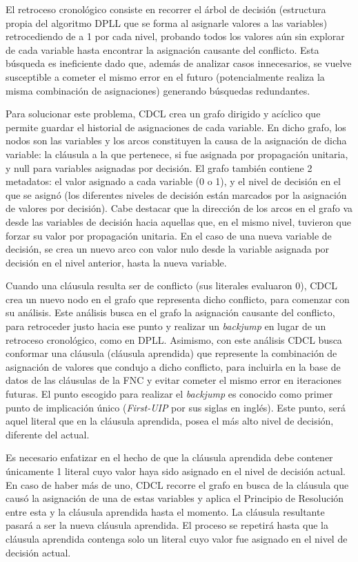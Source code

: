 El retroceso cronológico consiste en recorrer el árbol de decisión (estructura propia del algoritmo DPLL que se forma al asignarle valores a las variables) retrocediendo de a 1 por cada nivel, probando todos los valores aún sin explorar de cada variable hasta encontrar la asignación causante del conflicto. Esta búsqueda es ineficiente dado que, además de analizar casos innecesarios, se vuelve susceptible a cometer el mismo error en el futuro (potencialmente realiza la misma combinación de asignaciones) generando búsquedas redundantes.

Para solucionar este problema, CDCL crea un grafo dirigido y acíclico que permite guardar el historial de asignaciones de cada variable. En dicho grafo, los nodos son las variables y los arcos constituyen la causa de la asignación de dicha variable: la cláusula a la que pertenece, si fue asignada por propagación unitaria, y null para variables asignadas por decisión. El grafo también contiene 2 metadatos: el valor asignado a cada variable (0 o 1), y el nivel de decisión en el que se asignó (los diferentes niveles de decisión están marcados por la asignación de valores por decisión). Cabe destacar que la dirección de los arcos en el grafo va desde las variables de decisión hacia aquellas que, en el mismo nivel, tuvieron que forzar su valor por propagación unitaria. En el caso de una nueva variable de decisión, se crea un nuevo arco con valor nulo desde la variable asignada por decisión en el nivel anterior, hasta la nueva variable.

Cuando una cláusula resulta ser de conflicto (sus literales evaluaron 0), CDCL crea un nuevo nodo en el grafo que representa dicho conflicto, para comenzar con su análisis.
Este análisis busca en el grafo la asignación causante del conflicto, para retroceder justo hacia ese punto y realizar un \textit{backjump} en lugar de un retroceso cronológico, como en DPLL. Asimismo, con este análisis CDCL busca conformar una cláusula (cláusula aprendida) que represente la combinación de asignación de valores que condujo a dicho conflicto, para incluirla en la base de datos de las cláusulas de la FNC y evitar cometer el mismo error en iteraciones futuras. El punto escogido para realizar el \textit{backjump} es conocido como primer punto de implicación único (\textit{First-UIP} por sus siglas en inglés). Este punto, será aquel literal que en la cláusula aprendida, posea el más alto nivel de decisión, diferente del actual.

Es necesario enfatizar en el hecho de que la cláusula aprendida debe contener únicamente 1 literal cuyo valor haya sido asignado en el nivel de decisión actual. En caso de haber más de uno, CDCL recorre el grafo en busca de la cláusula que causó la asignación de una de estas variables y aplica el Principio de Resolución entre esta y la cláusula aprendida hasta el momento. La cláusula resultante pasará a ser la nueva cláusula aprendida. El proceso se repetirá hasta que la cláusula aprendida contenga solo un literal cuyo valor fue asignado en el nivel de decisión actual.

